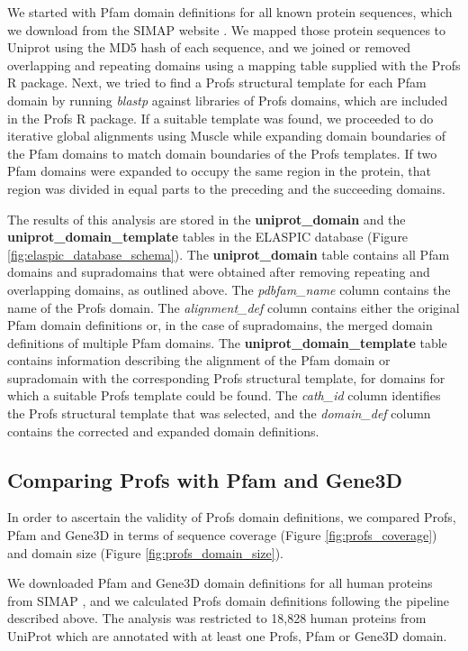 We started with Pfam domain definitions for all known protein sequences, which we download from the SIMAP website \cite{rattei_simapcomprehensive_2010}. We mapped those protein sequences to Uniprot using the MD5 hash of each sequence, and we joined or removed overlapping and repeating domains using a mapping table supplied with the Profs R package. Next, we tried to find a Profs structural template for each Pfam domain by running \textit{blastp} against libraries of Profs domains, which are included in the Profs R package. If a suitable template was found, we proceeded to do iterative global alignments using Muscle \cite{edgar_muscle:_2004} while expanding domain boundaries of the Pfam domains to match domain boundaries of the Profs templates. If two Pfam domains were expanded to occupy the same region in the protein, that region was divided in equal parts to the preceding and the succeeding domains.

The results of this analysis are stored in the \textbf{uniprot\_domain} and the \textbf{uniprot\_domain\_template} tables in the ELASPIC database (Figure \ref{fig:elaspic_database_schema}). The \textbf{uniprot\_domain} table contains all Pfam domains and supradomains that were obtained after removing repeating and overlapping domains, as outlined above. The \textit{pdbfam\_name} column contains the name of the Profs domain. The \textit{alignment\_def} column contains either the original Pfam domain definitions or, in the case of supradomains, the merged domain definitions of multiple Pfam domains. The \textbf{uniprot\_domain\_template} table contains information describing the alignment of the Pfam domain or supradomain with the corresponding Profs structural template, for domains for which a suitable Profs template could be found. The \textit{cath\_id} column identifies the Profs structural template that was selected, and the \textit{domain\_def} column contains the corrected and expanded domain definitions.


\subsection{Comparing Profs with Pfam and Gene3D}

In order to ascertain the validity of Profs domain definitions, we compared Profs, Pfam and Gene3D in terms of sequence coverage (Figure \ref{fig:profs_coverage}) and domain size (Figure \ref{fig:profs_domain_size}).

We downloaded Pfam and Gene3D domain definitions for all human proteins from SIMAP \cite{rattei_simapcomprehensive_2010}, and we calculated Profs domain definitions following the pipeline described above. The analysis was restricted to 18,828 human proteins from UniProt which are annotated with at least one Profs, Pfam or Gene3D domain.

